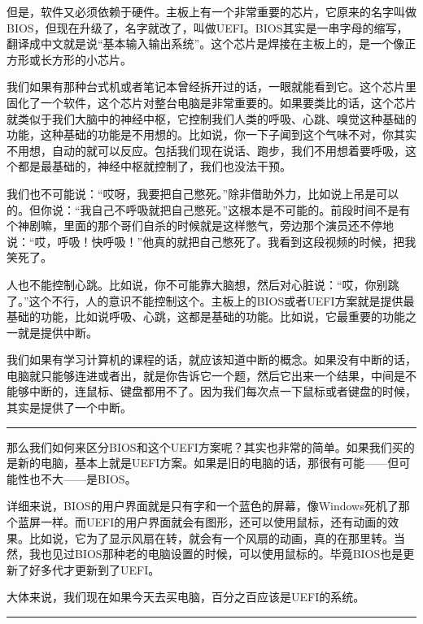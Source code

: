 \documentclass[
  letterpaper,
  DIV=11,
  numbers=noendperiod]{scrreprt}
\begin{document}
但是，软件又必须依赖于硬件。主板上有一个非常重要的芯片，它原来的名字叫做BIOS，但现在升级了，名字就改了，叫做UEFI。BIOS其实是一串字母的缩写，翻译成中文就是说``基本输入输出系统''。这个芯片是焊接在主板上的，是一个像正方形或长方形的小芯片。

我们如果有那种台式机或者笔记本曾经拆开过的话，一眼就能看到它。这个芯片里固化了一个软件，这个芯片对整台电脑是非常重要的。如果要类比的话，这个芯片就类似于我们大脑中的神经中枢，它控制我们人类的呼吸、心跳、嗅觉这种基础的功能，这种基础的功能是不用想的。比如说，你一下子闻到这个气味不对，你其实不用想，自动的就可以反应。包括我们现在说话、跑步，我们不用想着要呼吸，这个都是最基础的，神经中枢就控制了，我们也没法干预。

我们也不可能说：``哎呀，我要把自己憋死。''除非借助外力，比如说上吊是可以的。但你说：``我自己不呼吸就把自己憋死。''这根本是不可能的。前段时间不是有个神剧嘛，里面的那个哥们自杀的时候就是这样憋气，旁边那个演员还不停地说：``哎，呼吸！快呼吸！''他真的就把自己憋死了。我看到这段视频的时候，把我笑死了。

人也不能控制心跳。比如说，你不可能靠大脑想，然后对心脏说：``哎，你别跳了。''这个不行，人的意识不能控制这个。主板上的BIOS或者UEFI方案就是提供最基础的功能，比如说呼吸、心跳，这都是基础的功能。比如说，它最重要的功能之一就是提供中断。

我们如果有学习计算机的课程的话，就应该知道中断的概念。如果没有中断的话，电脑就只能够连进或者出，就是你告诉它一个题，然后它出来一个结果，中间是不能够中断的，连鼠标、键盘都用不了。因为我们每次点一下鼠标或者键盘的时候，其实是提供了一个中断。

\begin{center}\rule{0.5\linewidth}{0.5pt}\end{center}

那么我们如何来区分BIOS和这个UEFI方案呢？其实也非常的简单。如果我们买的是新的电脑，基本上就是UEFI方案。如果是旧的电脑的话，那很有可能------但可能性也不大------是BIOS。

详细来说，BIOS的用户界面就是只有字和一个蓝色的屏幕，像Windows死机了那个蓝屏一样。而UEFI的用户界面就会有图形，还可以使用鼠标，还有动画的效果。比如说，它为了显示风扇在转，就会有一个风扇的动画，真的在那里转。当然，我也见过BIOS那种老的电脑设置的时候，可以使用鼠标的。毕竟BIOS也是更新了好多代才更新到了UEFI。

大体来说，我们现在如果今天去买电脑，百分之百应该是UEFI的系统。

\begin{center}\rule{0.5\linewidth}{0.5pt}\end{center}
\end{document}
